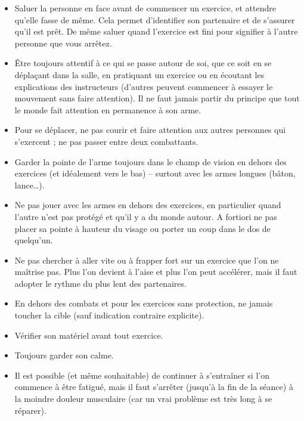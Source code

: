 \begin{itemize}
	\item Saluer la personne en face avant de commencer un exercice, et attendre qu'elle fasse de même.
	Cela permet d'identifier son partenaire et de s'assurer qu'il est prêt.
	De même saluer quand l'exercice est fini pour signifier à l'autre personne que vous arrêtez.
	
	\item Être toujours attentif à ce qui se passe autour de soi, que ce soit en se déplaçant dans la salle, en pratiquant un exercice ou en écoutant les explications des instructeurs (d'autres peuvent commencer à essayer le mouvement sans faire attention).
	Il ne faut jamais partir du principe que tout le monde fait attention en permanence à son arme.
	
	\item Pour se déplacer, ne pas courir et faire attention aux autres personnes qui s'exercent ; ne pas passer entre deux combattants.
	
	\item Garder la pointe de l'arme toujours dans le champ de vision en dehors des exercices (et idéalement vers le bas) -- surtout avec les armes longues (bâton, lance…).
	
	\item Ne pas jouer avec les armes en dehors des exercices, en particulier quand l'autre n'est pas protégé et qu'il y a du monde autour.
	A fortiori ne pas placer sa pointe à hauteur du visage ou porter un coup dans le dos de quelqu'un.
	
	\item Ne pas chercher à aller vite ou à frapper fort sur un exercice que l'on ne maîtrise pas.
	Plus l'on devient à l'aise et plus l'on peut accélérer, mais il faut adopter le rythme du plus lent des partenaires.
	
	\item En dehors des combats et pour les exercices sans protection, ne jamais toucher la cible (sauf indication contraire explicite).
	
	\item Vérifier son matériel avant tout exercice.
	
	\item Toujours garder son calme.
	
	\item Il est possible (et même souhaitable) de continuer à s'entraîner si l'on commence à être fatigué, mais il faut s'arrêter (jusqu'à la fin de la séance) à la moindre douleur musculaire (car un vrai problème est très long à se réparer).
\end{itemize}


